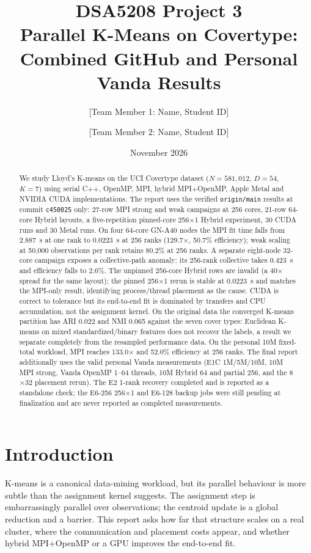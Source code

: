 \documentclass[10pt,a4paper]{article}
\title{\vspace{-1.4cm}\textbf{DSA5208 Project 3}\\Parallel K-Means on Covertype: Combined GitHub and Personal Vanda Results}
\author{[Team Member 1: Name, Student ID] \and [Team Member 2: Name, Student ID]}
\date{November 2026}
\newcommand{\code}[1]{\texttt{#1}}
\begin{document}
\maketitle

\begin{abstract}
We study Lloyd's K-means on the UCI Covertype dataset ($N=581{,}012$,
$D=54$, $K=7$) using serial C++, OpenMP, MPI, hybrid MPI+OpenMP, Apple Metal
and NVIDIA CUDA implementations. The report uses the verified
\code{origin/main} results at commit \code{c450025} only: 27-row MPI strong
and weak campaigns at 256 cores, 21-row 64-core Hybrid layouts, a
five-repetition pinned-core 256$\times$1 Hybrid experiment, 30 CUDA runs and
30 Metal runs. On four 64-core GN-A40 nodes the MPI fit time falls from
2.887~s at one rank to 0.0223~s at 256 ranks (129.7$\times$, 50.7\%
efficiency); weak scaling at 50,000 observations per rank retains 80.2\% at
256 ranks. A separate eight-node 32-core campaign exposes a collective-path
anomaly: its 256-rank collective takes 0.423~s and efficiency falls to 2.6\%.
The unpinned 256-core Hybrid rows are invalid (a 40$\times$ spread for the same
layout); the pinned 256$\times$1 rerun is stable at 0.0223~s and matches the
MPI-only result, identifying process/thread placement as the cause. CUDA is
correct to tolerance but its end-to-end fit is dominated by transfers and CPU
accumulation, not the assignment kernel. On the original data the converged
K-means partition has ARI 0.022 and NMI 0.065 against the seven cover types:
Euclidean K-means on mixed standardized/binary features does not recover the
labels, a result we separate completely from the resampled performance data.
On the personal 10M fixed-total workload, MPI reaches 133.0$\times$ and
52.0\% efficiency at 256 ranks. The final report additionally uses the valid personal Vanda measurements
(E1C 1M/5M/10M, 10M MPI strong, Vanda OpenMP 1--64 threads, 10M Hybrid 64 and
partial 256, and the 8$\times$32 placement rerun). The E2 1-rank recovery completed and is reported as a standalone check; the
E6-256 256$\times$1 and E6-128 backup jobs were still pending at finalization
and are never reported as completed measurements.
\end{abstract}

\section{Introduction}
K-means \citep{lloyd1982,macqueen1967} is a canonical data-mining workload, but its parallel behaviour is
more subtle than the assignment kernel suggests. The assignment step is
embarrassingly parallel over observations; the centroid update is a global
reduction and a barrier. This report asks how far that structure scales on a
real cluster, where the communication and placement costs appear, and whether
hybrid MPI+OpenMP or a GPU improves the end-to-end fit.
\end{document}
